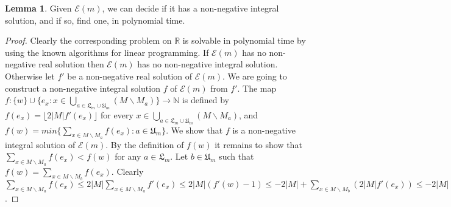 \documentclass{article}
\theoremstyle{definition}
\newtheorem{lem}{Lemma}
\newcommand\set[1]{\{ #1 \}}
\begin{document}
\begin{lem}
\label{find a solution}
Given $\mathcal{E}(m)$, we can decide if it has a non-negative integral solution, and if so, find one, in polynomial time.
\end{lem}
\begin{proof}
Clearly the corresponding problem on $\mathbb{R}$ is solvable in polynomial time by using the known algorithms for linear programming. If $\mathcal{E}(m)$ has no non-negative real solution then $\mathcal{E}(m)$ has no non-negative integral solution. Otherwise let $f'$ be a non-negative real solution of $\mathcal{E}(m)$. We are going to construct a non-negative integral solution $f$ of $\mathcal{E}(m)$ from $f'$. The map $f:\set{w}\cup \set{
e_x: x \in \underset{a \in \mathfrak{L}_m\cup \mathfrak{U}_m}{\bigcup} (M\backslash M_a)
}\to \mathbb{N}$ is defined by $f(e_x)=\lfloor 2|M|f'(e_x)\rfloor$ for every $x \in \underset{a \in \mathfrak{L}_m\cup \mathfrak{U}_m}{\bigcup} (M\backslash M_a)$, and $f(w)=min\set{
\underset{x \in M\backslash M_a}{\sum} f(e_x): a\in \mathfrak{U}_m
}$. We show that $f$ is a non-negative integral solution of $\mathcal{E}(m)$. By the definition of $f(w)$ it remains to show that $\underset{x \in M\backslash M_a}{\sum} f(e_x)<f(w)$ for any $a \in \mathfrak{L}_m$. Let $b \in \mathfrak{U}_m$ such that $f(w)=\underset{x \in M\backslash M_b}{\sum} f(e_x)$. Clearly $\underset{x \in M\backslash M_a}{\sum} f(e_x)\leq 2|M|\underset{x \in M\backslash M_a}{\sum}f'(e_x)\leq 2|M| (f'(w)-1)\leq -2|M|+\underset{x \in M\backslash M_b}{\sum} (2|M|f'(e_x))\leq -2|M|+\underset{x \in M\backslash M_b}{\sum} (\lfloor 2|M|f'(e_x)\rfloor+1)\leq -2 |M|+|M|+f(w)<f(w)$.
\end{proof}
\end{document}
